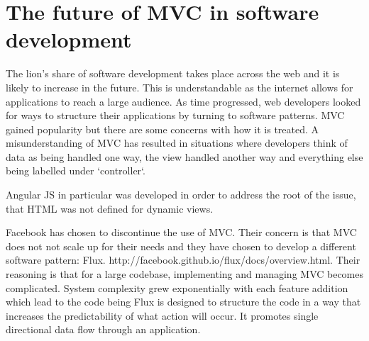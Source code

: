 \section{The future of MVC in software development}

The lion's share of software development takes place across the web and it is likely to increase in the future. This is understandable
as the internet allows for applications to reach a large audience. As time progressed, web developers looked for ways to structure their
applications by turning to software patterns. MVC gained popularity but there are some concerns with how it is treated. A misunderstanding of
MVC has resulted in situations where developers think of data as being handled one way, the view handled another way and everything else being labelled
under `controller`.\par


Angular JS in particular was developed in order to address the root of the issue, that HTML was not defined for dynamic views.\par
{}\par

Facebook has chosen to discontinue the use of MVC. Their concern is that MVC does not not scale up for their needs and they have chosen to
develop a different software pattern: Flux. http://facebook.github.io/flux/docs/overview.html. Their reasoning is that for a large codebase, implementing
and managing MVC becomes complicated. System complexity grew exponentially with each feature addition which lead to the code being 
Flux is designed to structure the code in a way that increases the predictability of what action will occur. It promotes single directional data flow
through an application. \par

